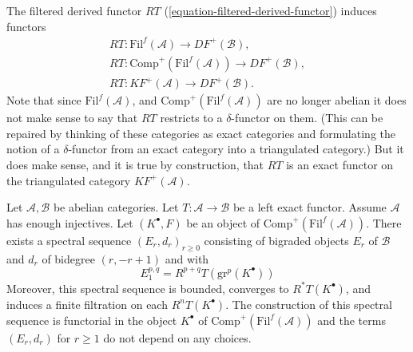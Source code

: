 \medskip\noindent
The filtered derived functor $RT$ (\ref{equation-filtered-derived-functor})
induces functors
$$
\begin{matrix}
RT : \text{Fil}^f(\mathcal{A}) \to DF^{+}(\mathcal{B}), \\
RT : \text{Comp}^{+}(\text{Fil}^f(\mathcal{A})) \to DF^{+}(\mathcal{B}), \\
RT : KF^{+}(\mathcal{A}) \to DF^{+}(\mathcal{B}).
\end{matrix}
$$
Note that since $\text{Fil}^f(\mathcal{A})$, and
$\text{Comp}^{+}(\text{Fil}^f(\mathcal{A}))$ are no longer
abelian it does not make sense to say that $RT$ restricts to
a $\delta$-functor on them. (This can be
repaired by thinking of these categories as exact categories and
formulating the notion of a $\delta$-functor from an exact category
into a triangulated category.)
But it does make sense, and it is true
by construction, that $RT$ is an exact functor on the triangulated
category $KF^{+}(\mathcal{A})$.

\begin{lemma}
\label{lemma-ss-filtered-derived}
Let $\mathcal{A}, \mathcal{B}$ be abelian categories. Let
$T : \mathcal{A} \to \mathcal{B}$ be a left exact functor.
Assume $\mathcal{A}$ has enough injectives.
Let $(K^\bullet, F)$ be an object of
$\text{Comp}^{+}(\text{Fil}^f(\mathcal{A}))$.
There exists a spectral sequence $(E_r, d_r)_{r\geq 0}$
consisting of bigraded objects $E_r$ of $\mathcal{B}$
and $d_r$ of bidegree $(r, - r + 1)$ and with
$$
E_1^{p, q} = R^{p + q}T(\text{gr}^p(K^\bullet))
$$
Moreover, this spectral sequence is bounded, converges
to $R^*T(K^\bullet)$, and induces a finite
filtration on each $R^nT(K^\bullet)$. The construction
of this spectral sequence is functorial in the object
$K^\bullet$ of $\text{Comp}^{+}(\text{Fil}^f(\mathcal{A}))$
and the terms $(E_r, d_r)$ for $r \geq 1$ do not depend
on any choices.
\end{lemma}

